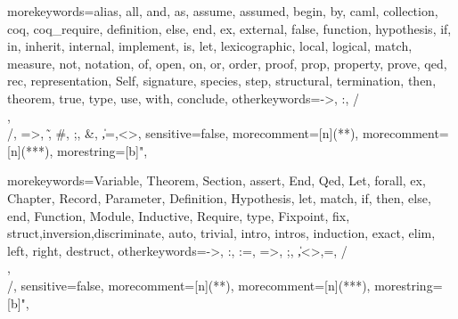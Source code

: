 \usepackage{amsmath}
\usepackage{amsfonts}
\usepackage{listings}
\lstset{basicstyle=\footnotesize\mdseries\itshape\ttfamily,
        frame=single} %
\usepackage{mathpartir}
\usepackage{times}   %
\usepackage{color}
\usepackage{url}

\newcommand{\ocaml}{{\sf OCaml}}
\newcommand{\focal}{{\sf Fo\-Ca\-Li\-ze}}
\newcommand{\zenon}{{\sf Zenon}}
\newcommand{\coq}{{\sf Coq}}

\newcommand{\logand}{\wedge}
\newcommand{\logor}{\vee}

\newcommand{\green}[1]{{\color{green}{#1}}}
\newcommand{\red}[1]{{\color{red}{#1}}}
\newcommand{\blue}[1]{{\color{blue}{#1}}}
\newcommand{\orange}[1]{{\color{orange}{#1}}}
\newcommand{\brown}[1]{{\color{brown}{#1}}}
\newcommand{\magenta}[1]{{\color{magenta}{#1}}}
\newcommand{\cyan}[1]{{\color{cyan}{#1}}}
\newcommand{\darkblue}[1]{{\color{darkblue}{#1}}}

  {morekeywords={alias, all, and, as, assume, assumed, begin, by, caml,
      collection, coq, coq_require, definition, else, end,
      ex, external, false, function, hypothesis, if, in,
      inherit, internal, implement, is, let, lexicographic,
      local, logical, match, measure, not, notation, of, open,
      on, or, order, proof, prop, property, prove, qed, rec,
      representation, Self, signature, species, step,
      structural, termination, then, theorem, true, type, use,
      with, conclude},
    otherkeywords={->, :, /\\, \\/, =>, \~, \#, ;, \&, \|,=,<>},
    sensitive=false,
    morecomment=[n]{(*}{*)},  %
    morecomment=[n]{(**}{*)}, %
    morestring=[b]",
  }

\newcommand{\setlangfocalize}{
\lstset{
  language=FoCaLiZe, tabsize=2, frame=single, breaklines=true,
  basicstyle=\ttfamily, framexleftmargin=1mm, xleftmargin=1mm
}
}
\setlangfocalize

  {morekeywords={Variable, Theorem, Section, assert, End, Qed, Let,
      forall, ex, Chapter, Record, Parameter, Definition, Hypothesis,
      let, match, if, then, else, end, Function, Module, Inductive,
      Require, type, Fixpoint, fix, struct,inversion,discriminate,
      auto, trivial, intro, intros, induction, exact, elim, left,
      right, destruct},
    otherkeywords={->, :, :=, =>, ;, \|,<>,=, /\\, \\/},
    sensitive=false,
    morecomment=[n]{(*}{*)},   %
    morecomment=[n]{(**}{*)},  %
    morestring=[b]",
  }

\newcommand{\setlangcoq}{
\lstset{
  language=MyCoq, tabsize=2, frame=single, breaklines=true,
  basicstyle=\ttfamily, framexleftmargin=1mm, xleftmargin=1mm
}
}
